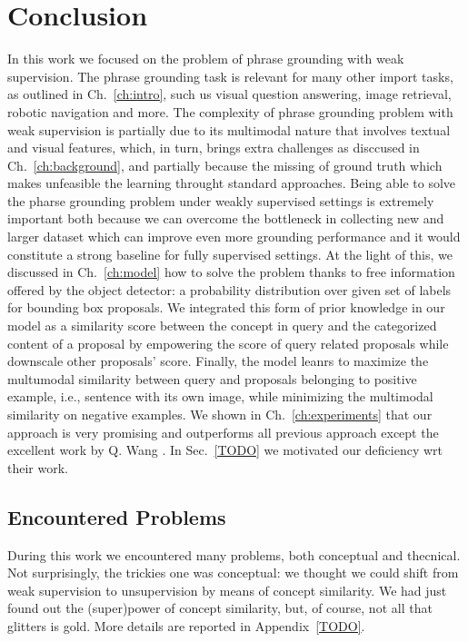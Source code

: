 \chapter{Conclusion}
\label{conclusion}

In this work we focused on the problem of phrase grounding with weak
supervision. The phrase grounding task is relevant for many other
import tasks, as outlined in Ch.~\ref{ch:intro}, such us visual
question answering, image retrieval, robotic navigation and more. The
complexity of phrase grounding problem with weak supervision is
partially due to its multimodal nature that involves textual and
visual features, which, in turn, brings extra challenges as disccused
in Ch.~\ref{ch:background}, and partially because the missing of
ground truth which makes unfeasible the learning throught standard
approaches. Being able to solve the pharse grounding problem under
weakly supervised settings is extremely important both because we can
overcome the bottleneck in collecting new and larger dataset which can
improve even more grounding performance and it would constitute a
strong baseline for fully supervised settings. At the light of this,
we discussed in Ch.~\ref{ch:model} how to solve the problem thanks to
free information offered by the object detector: a probability
distribution over given set of labels for bounding box proposals. We
integrated this form of prior knowledge in our model as a similarity
score between the concept in query and the categorized content of a
proposal by empowering the score of query related proposals while
downscale other proposals' score. Finally, the model leanrs to
maximize the multumodal similarity between query and proposals
belonging to positive example, i.e., sentence with its own image,
while minimizing the multimodal similarity on negative examples. We
shown in Ch.~\ref{ch:experiments} that our approach is very promising
and outperforms all previous approach except the excellent work by Q.
Wang \etal{} \cite{wang2020maf}. In Sec.~\ref{TODO} we motivated our
deficiency wrt their work. 

\section{Encountered Problems}

During this work we encountered many problems, both conceptual and
thecnical. Not surprisingly, the trickies one was conceptual: we
thought we could shift from weak supervision to unsupervision by means
of concept similarity. We had just found out the (super)power of
concept similarity, but, of course, not all that glitters is gold.
More details are reported in Appendix~\ref{TODO}.

